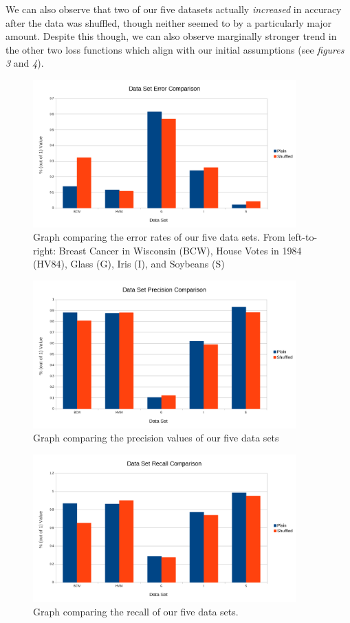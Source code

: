 \documentclass[twoside,11pt]{article}
\begin{document}
	We can also observe that two of our five datasets actually \textit{increased} in accuracy after the data was shuffled, though neither seemed to by a particularly major amount. Despite this though, we can also observe marginally stronger trend in the other two loss functions which align with our initial assumptions (see \textit{figures 3} and \textit{4}). \bigbreak
	
	\begin{figure}[!h]
		\centering
		\includegraphics[width=0.9\textwidth]{error_comparison.png}
		\caption{\label{fig:2} Graph comparing the error rates of our five data sets. From left-to-right: Breast Cancer in Wisconsin (BCW), House Votes in 1984 (HV84), Glass (G), Iris (I), and Soybeans (S)}
	\end{figure}
	\begin{figure}[!h]
		\centering
		\includegraphics[width=0.9\textwidth]{precision_comparison.png}
		\caption{\label{fig:3} Graph comparing the precision values of our five data sets}
	\end{figure}
	\begin{figure}[!h]
		\centering
		\includegraphics[width=0.9\textwidth]{recall_comparison.png}
		\caption{\label{fig:4} Graph comparing the recall of our five data sets.}
	\end{figure}
\end{document}
